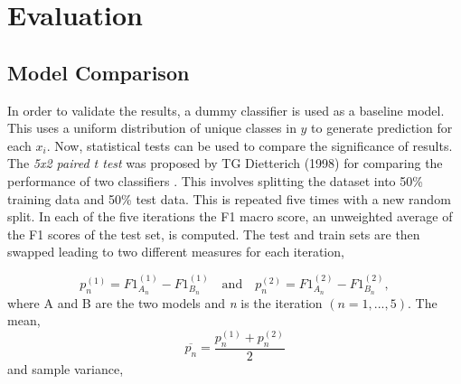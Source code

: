 \documentclass[conference]{IEEEtran}
\begin{document}

\section{Evaluation}
\subsection{Model Comparison}
In order to validate the results, a dummy classifier is used as a baseline model. This uses a uniform distribution of unique classes in $y$ to generate prediction for each $x_{i}$. Now, statistical tests can be used to compare the significance of results. The \textit{5x2 paired t test} was proposed by TG Dietterich (1998) for comparing the performance of two classifiers \cite{dietterich1998approximate}. This involves splitting the dataset into 50\% training data and 50\% test data. This is repeated five times with a new random split. In each of the five iterations the F1 macro score, an unweighted average of the F1 scores of the test set, is computed. The test and train sets are then swapped leading to two different measures for each iteration, 

\begin{equation}
    p_{n}^{(1)} = F1_{A_{n}}^{(1)} - F1_{B_{n}}^{(1)}
    \quad\text{and}\quad 
    p_{n}^{(2)} = F1_{A_{n}}^{(2)} - F1_{B_{n}}^{(2)},
\end{equation}
where A and B are the two models and \textit{n} is the iteration $(n = 1,...,5)$. The mean,
\begin{equation}
    \overline{p_{n}}=\frac{p_{n}^{(1)}+p_{n}^{(2)}}{2}
\end{equation}
and sample variance,
\end{document}
